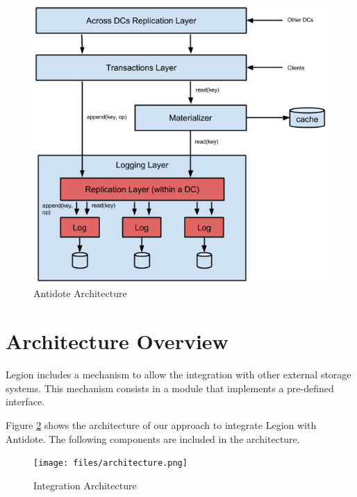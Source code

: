 \begin{figure}[H]
\centering
\includegraphics[scale=0.4]{files/antidoteArchitecture.png}
\caption{Antidote Architecture}
\label{antidote_architecture}
\end{figure}

\section{Architecture Overview}
\label{sec:architecture_overview}
Legion includes a mechanism to allow the integration with other external storage systems. This mechanism consists in a module that implements a pre-defined interface.\par
	Figure \ref{architecture} shows the architecture of our approach to integrate Legion with Antidote. The following components are included in the architecture.
	
\begin{figure}[h]
\centering
\texttt{[image: files/architecture.png]}
\caption{Integration Architecture}
\label{architecture}
\end{figure}


